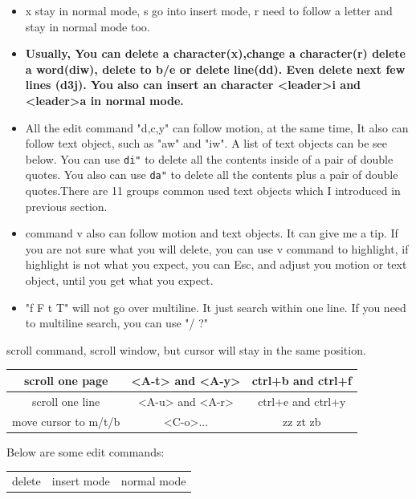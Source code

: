 \documentclass[a4paper,12pt,twoside]{book}
\begin{document}
\begin{itemize}
\begin{center}
\begin{itemize}
				\item x stay in normal mode, s go into insert mode, r need to follow a letter and stay in normal mode too.
				
				\item \textbf{Usually, You can delete a character(x),change a character(r) delete a word(diw), delete to b/e or delete line(dd). Even delete next few lines (d3j). You also can insert an character <leader>i and <leader>a in normal mode. }  
				
				\item All the edit command "d,c,y" can follow motion, at the same time, It also can follow text object, such as "aw" and "iw". A list of text objects can be see below.  You can use \verb=di"= to delete all the contents inside of a pair of double quotes. You also can use \verb=da"= to delete all the contents plus a pair of double quotes.There are 11 groups common used text objects which I introduced in previous section. 
						
				\item command v also can follow motion and text objects. It can give me a tip. If you are not sure what you will delete, you can use v command to highlight, if highlight is not what you expect, you can Esc, and adjust you motion or text object, until you get what you expect. 

				\item "f F t T" will not go over multiline. It just search within one line. If you need to multiline search, you can use "/ ?" 
		\end{itemize}

 scroll command, scroll window, but cursor will stay in the same position.

 
 \begin{tabular}{c|c|c}
        \hline
        scroll one  page &  <A-t> and <A-y>  & ctrl+b and  ctrl+f    \\
        
        \hline 		  
        scroll one line &  <A-u> and <A-r>  & ctrl+e and ctrl+y \\
        
         \hline 		  
        move cursor to m/t/b & <C-o>...    & zz zt zb \\

    \end{tabular}
\end{center}
 
Below are some edit commands:
\begin{center}
		\begin{tabular}{c|c|c}
		\hline
		delete & insert mode & normal mode\\


\end{tabular}
\end{center}
\end{itemize}
\end{document}
